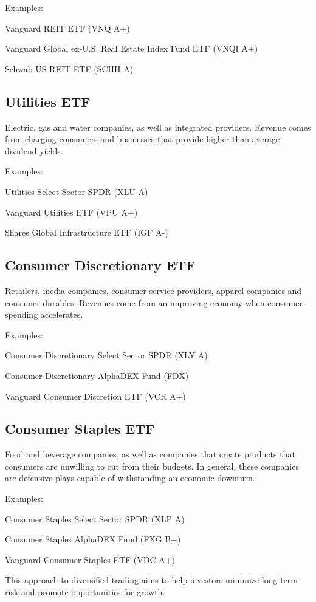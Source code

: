 \documentclass[11pt]{article}
\begin{document}
Examples:


Vanguard REIT ETF (VNQ A+)


Vanguard Global ex-U.S. Real Estate Index Fund ETF (VNQI A+)


Schwab US REIT ETF (SCHH A)


\subsection{Utilities ETF}

Electric, gas and water companies, as well as integrated providers. Revenue comes from charging consumers and businesses that provide higher-than-average dividend yields.


Examples:


Utilities Select Sector SPDR (XLU A)


Vanguard Utilities ETF (VPU A+)


Shares Global Infrastructure ETF (IGF A-)


\subsection{Consumer Discretionary ETF}

Retailers, media companies, consumer service providers, apparel companies and consumer durables. Revenues come from an improving economy when consumer spending accelerates.


Examples:


Consumer Discretionary Select Sector SPDR (XLY A)


Consumer Discretionary AlphaDEX Fund (FDX)


Vanguard Consumer Discretion ETF (VCR A+)


\subsection{Consumer Staples ETF}

Food and beverage companies, as well as companies that create products that consumers are unwilling to cut from their budgets. In general, these companies are defensive plays capable of withstanding an economic downturn.


Examples:


Consumer Staples Select Sector SPDR (XLP A)


Consumer Staples AlphaDEX Fund (FXG B+)


Vanguard Consumer Staples ETF (VDC A+)


This approach to diversified trading aims to help investors minimize long-term risk and promote opportunities for growth.
\end{document}
